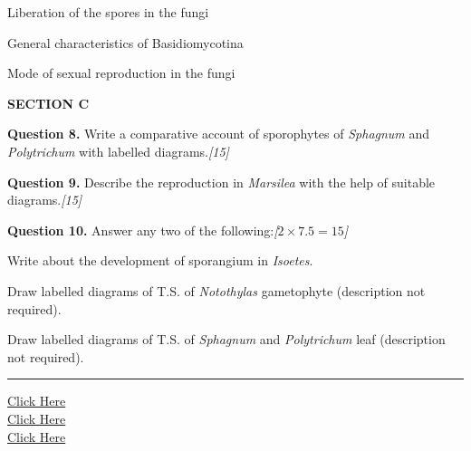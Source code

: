 \documentclass[11pt,a4paper]{article}
\newcommand{\pts}[1]{\hfill   \textit{[#1]}}
\begin{document}
\begin{parts}
  \item Liberation of the spores in the fungi
  \item General characteristics of Basidiomycotina
  \item Mode of sexual reproduction in the fungi
\end{parts}

\bigskip

\begin{center}
   \textbf{SECTION C}
\end{center}
\medskip

\medskip


\noindent   \textbf{Question 8.} Write a comparative account of sporophytes of   \textit{Sphagnum} and   \textit{Polytrichum} with labelled diagrams.\pts{15}

\medskip


\noindent   \textbf{Question 9.} Describe the reproduction in   \textit{Marsilea} with the help of suitable diagrams.\pts{15}

\medskip


\noindent   \textbf{Question 10.} Answer any two of the following:\pts{$2  \times 7.5 = 15$}

\begin{parts}
  \item Write about the development of sporangium in   \textit{Isoetes}.
  \item Draw labelled diagrams of T.S. of   \textit{Notothylas} gametophyte (description not required).
  \item Draw labelled diagrams of T.S. of   \textit{Sphagnum} and   \textit{Polytrichum} leaf (description not required).
\end{parts}

\vfill
\rule{\linewidth}{0.4pt}

\begin{center}\small
\href{https://bhu-exam.vercel.app/}{Click Here}\\[4pt]\href{https://me-aryan.vercel.app/}{Click Here}\\[4pt]\href{https://quashan-me.vercel.app/}{Click Here}
\end{center}
\end{document}
